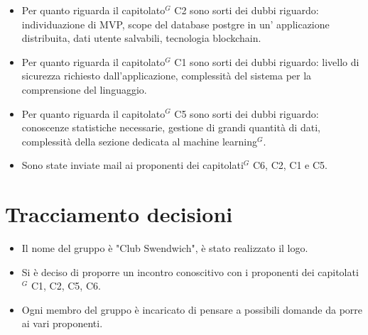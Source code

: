 \begin{itemize}
    \item Per quanto riguarda il capitolato$^{G}$ C2 sono sorti dei dubbi riguardo: individuazione di MVP, scope del database postgre in un' applicazione distribuita, dati utente salvabili, tecnologia blockchain.
    \item Per quanto riguarda il capitolato$^{G}$ C1 sono sorti dei dubbi riguardo: livello di sicurezza richiesto dall'applicazione, complessità del sistema per la comprensione del linguaggio.
    \item Per quanto riguarda il capitolato$^{G}$ C5 sono sorti dei dubbi riguardo: conoscenze statistiche necessarie, gestione di grandi quantità di dati, complessità della sezione dedicata al machine learning$^{G}$.
    \item Sono state inviate mail ai proponenti dei capitolati$^{G}$ C6, C2, C1 e C5.
\end{itemize}
\section{Tracciamento decisioni}
\begin{itemize}
    \item Il nome del gruppo è "Club Swendwich", è stato realizzato il logo.
    \item Si è deciso di proporre un incontro conoscitivo con i proponenti dei capitolati$^{G}$ C1, C2, C5, C6.
    \item Ogni membro del gruppo è incaricato di pensare a possibili domande da porre ai vari proponenti.
\end{itemize}